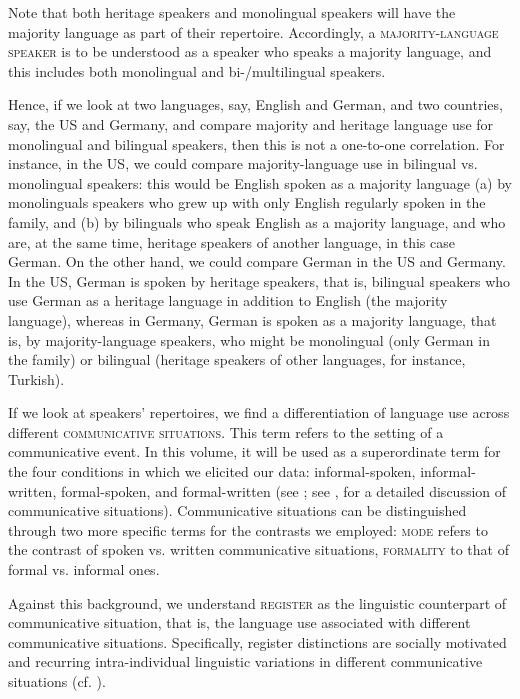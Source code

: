 \documentclass[output=paper,colorlinks,citecolor=brown]{langscibook}
\begin{document}
Note that both heritage speakers and monolingual speakers will have the majority language as part of their repertoire. Accordingly, a \textsc{majority-language} \textsc{speaker} is to be understood as a speaker who speaks a majority language, and this includes both monolingual and bi-/multilingual speakers.

Hence, if we look at two languages, say, English and German, and two countries, say, the US and Germany, and compare majority and heritage language use for monolingual and bilingual speakers, then this is not a one-to-one correlation. For instance, in the US, we could compare majority-language use in bilingual vs. monolingual speakers: this would be English spoken as a majority language (a) by monolinguals speakers who grew up with only English regularly spoken in the family, and (b) by bilinguals who speak English as a majority language, and who are, at the same time, heritage speakers of another language, in this case German. On the other hand, we could compare German in the US and Germany. In the US, German is spoken by heritage speakers, that is, bilingual speakers who use German as a heritage language in addition to English (the majority language), whereas in Germany, German is spoken as a majority language, that is, by majority-language speakers, who might be monolingual (only German in the family) or bilingual (heritage speakers of other languages, for instance, Turkish).

If we look at speakers’ repertoires, we find a differentiation of language use across different \textsc{communicative} \textsc{situations}. This term refers to the setting of a communicative event. In this volume, it will be used as a superordinate term for the four conditions in which we elicited our data: informal-spoken, informal-written, formal-spoken, and formal-written (see ; see \citealt{Wiese2020,Wiese2023}, for a detailed discussion of communicative situations). Communicative situations can be distinguished through two more specific terms for the contrasts we employed: \textsc{mode} refers to the contrast of spoken vs. written communicative situations, \textsc{formality} to that of formal vs. informal ones.

Against this background, we understand \textsc{register} as the linguistic counterpart of communicative situation, that is, the language use associated with different communicative situations. Specifically, register distinctions are socially motivated and recurring intra-individual linguistic variations in different communicative situations (cf. \citealt{LüdelingEtAl2022}).
\end{document}

